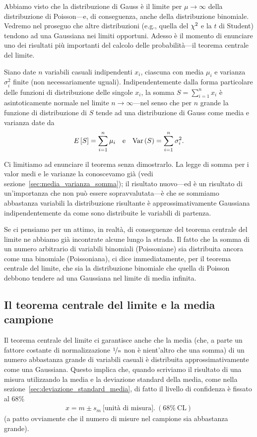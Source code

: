 Abbiamo visto che la distribuzione di Gauss è il limite per
$\mu \rightarrow \infty$ della distribuzione di Poisson---e, di conseguenza,
anche della distribuzione binomiale. Vedremo nel proseguo che altre
distribuzioni (e.g., quella del $\chi^2$ e la $t$ di Student) tendono ad
una Gaussiana nei limiti opportuni. Adesso è il momento di enunciare uno
dei risultati più importanti del calcolo delle probabilità---il teorema
centrale del limite.

\begin{theorem}
  Siano date $n$ variabili casuali indipendenti $x_i$, ciascuna con media
  $\mu_i$ e varianza $\sigma^2_i$ finite (non necessariamente uguali).
  Indipendentemente dalla forma particolare delle funzioni di distribuzione
  delle singole $x_i$, la somma $S = \sum_{i = 1}^n x_i$ è asintoticamente
  normale nel limite $n \rightarrow \infty$---nel senso che per $n$ grande la
  funzione di distribuzione di $S$ tende ad una distribuzione di Gauss come
  media e varianza date da
  \begin{align*}
    \displaystyle E\left[S\right] = \sum_{i = 1}^n \mu_i \quad \text{e} \quad
    \text{Var}\left(S\right) = \sum_{i = 1}^n \sigma^2_i.
  \end{align*}
\end{theorem}

Ci limitiamo ad enunciare il teorema senza dimostrarlo. La legge di somma per
i valor medi e le varianze la conoscevamo già (vedi
sezione~\ref{sec:media_varianza_somma}); il risultato nuovo---ed è un
risultato di un'importanza che non può essere sopravvalutata---è che se
sommiamo abbastanza variabili la distribuzione risultante è
approssimativamente Gaussiana indipendentemente da come sono distribuite le
variabili di partenza.

Se ci pensiamo per un attimo, in realtà, di conseguenze del teorema centrale
del limite ne abbiamo già incontrate alcune lungo la strada. Il fatto che la
somma di un numero arbitrario di variabili binomiali (Poissoniane) sia
distribuita ancora come una binomiale (Poissoniana), ci dice immediatamente,
per il teorema centrale del limite, che sia la distribuzione binomiale che
quella di Poisson debbono tendere ad una Gaussiana nel limite di media infinita.


\subsection{Il teorema centrale del limite e la media campione}

Il teorema centrale del limite ci garantisce anche che la media (che, a parte
un fattore costante di normalizzazione $\nicefrac{1}{n}$ non è nient'altro
che una somma) di un numero abbastanza grande di variabili casuali è
distribuita approssimativamente come una Gaussiana. Questo implica che, quando
scriviamo il risultato di una misura utilizzando la media e la deviazione
standard della media, come nella sezione~\ref{sec:deviazione_standard_media},
di fatto il livello di confidenza è fissato al $68\%$
\begin{align}
  x = m \pm s_m~\text{[unità di misura].}~(68\%~\text{CL})
\end{align}
(a patto ovviamente che il numero di misure nel campione sia abbastanza grande).


